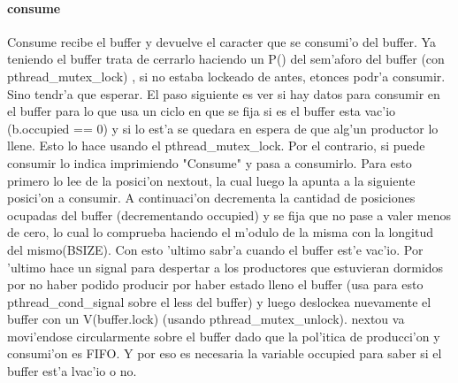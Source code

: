 \paragraph{consume}
Consume recibe el buffer y devuelve el caracter que se consumi'o del buffer. Ya teniendo el buffer trata de cerrarlo haciendo un P() del sem'aforo del buffer (con pthread\_mutex\_lock) , si no estaba lockeado de antes, etonces podr'a consumir. Sino tendr'a que esperar. El paso siguiente es ver si hay datos para consumir en el buffer para lo que usa un ciclo en que se fija si es el buffer esta vac'io (b.occupied == 0) y si lo est'a se quedara en espera de que alg'un productor lo llene. Esto lo hace usando el pthread\_mutex\_lock. Por el contrario, si puede consumir lo indica imprimiendo "Consume" y pasa a consumirlo. Para esto primero lo lee de la posici'on nextout, la cual luego la apunta a la siguiente posici'on a consumir. A continuaci'on decrementa la cantidad de posiciones ocupadas del buffer (decrementando occupied) y se fija que no pase a valer menos de cero, lo cual lo comprueba haciendo el m'odulo de la misma con la longitud del mismo(BSIZE). Con esto 'ultimo sabr'a cuando el buffer est'e vac'io. Por 'ultimo hace un signal para despertar a los productores que estuvieran dormidos por no haber podido producir por haber estado lleno el buffer (usa para esto pthread\_cond\_signal sobre el less del buffer) y luego deslockea nuevamente el buffer con un V(buffer.lock) (usando pthread\_mutex\_unlock). nextou va movi'endose circularmente sobre el buffer dado que la pol'itica de producci'on y consumi'on es FIFO. Y por eso es necesaria la variable occupied para saber si el buffer est'a lvac'io o no.

